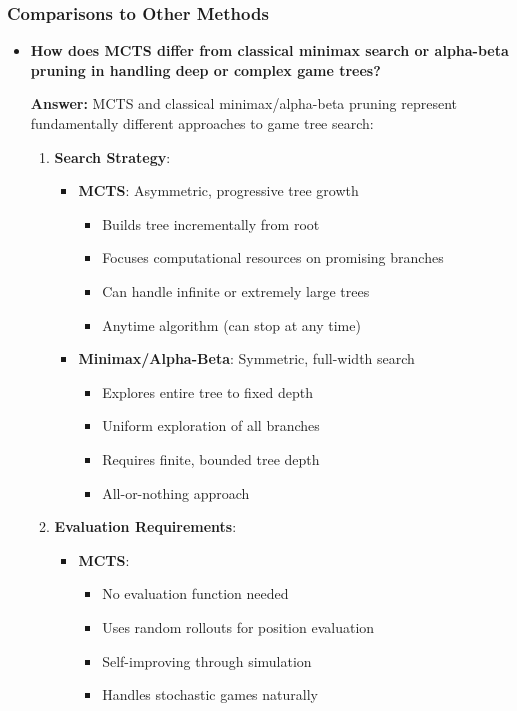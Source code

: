 \subsubsection{Comparisons to Other Methods}
\begin{itemize}
    \item \textbf{How does MCTS differ from classical minimax search or alpha-beta pruning in handling deep or complex game trees?}
    
    \textbf{Answer:} MCTS and classical minimax/alpha-beta pruning represent fundamentally different approaches to game tree search:
    
    \begin{enumerate}
        \item \textbf{Search Strategy}:
        \begin{itemize}
            \item \textbf{MCTS}: Asymmetric, progressive tree growth
            \begin{itemize}
                \item Builds tree incrementally from root
                \item Focuses computational resources on promising branches
                \item Can handle infinite or extremely large trees
                \item Anytime algorithm (can stop at any time)
            \end{itemize}
            
            \item \textbf{Minimax/Alpha-Beta}: Symmetric, full-width search
            \begin{itemize}
                \item Explores entire tree to fixed depth
                \item Uniform exploration of all branches
                \item Requires finite, bounded tree depth
                \item All-or-nothing approach
            \end{itemize}
        \end{itemize}
        
        \item \textbf{Evaluation Requirements}:
        \begin{itemize}
            \item \textbf{MCTS}: 
            \begin{itemize}
                \item No evaluation function needed
                \item Uses random rollouts for position evaluation
                \item Self-improving through simulation
                \item Handles stochastic games naturally
            \end{itemize}
            

\end{itemize}
\end{enumerate}
\end{itemize}
